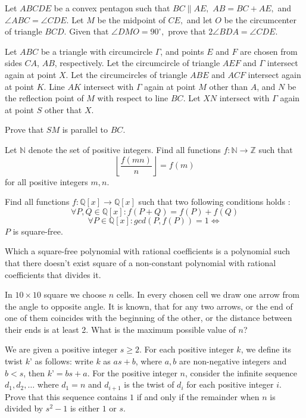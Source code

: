\documentclass[11pt]{scrartcl}
\begin{document}
\begin{problem}[5891289107244537458]
Let $ABCDE$ be a convex pentagon such that $BC \parallel AE,$ $AB = BC +  AE,$ and $\angle ABC = \angle CDE.$ Let $M$ be the midpoint of $CE,$ and let $O$ be the circumcenter of triangle $BCD.$ Given that $\angle DMO = 90^{\circ},$ prove that $2 \angle BDA = \angle CDE.$
\end{problem}
\begin{problem}[5897111412933990257]
Let $ABC$ be a triangle with circumcircle $\Gamma$, and points $E$ and $F$ are chosen from sides $CA$, $AB$, respectively. Let the circumcircle of triangle $AEF$ and $\Gamma$ intersect again at point $X$. Let the circumcircles of triangle $ABE$ and $ACF$ intersect again at point $K$. Line $AK$ intersect with $\Gamma$ again at point $M$ other than $A$, and $N$ be the reflection point of $M$ with respect to line $BC$. Let $XN$ intersect with $\Gamma$ again at point $S$ other that $X$.

Prove that $SM$ is parallel to $BC$.
\end{problem}
\begin{problem}[5901329049595563801]
Let $\mathbb{N}$ denote the set of positive integers. Find all functions $f \colon \mathbb{N} \to \mathbb{Z}$ such that\[\left\lfloor \frac{f(mn)}{n} \right\rfloor=f(m)\]for all positive integers $m,n$.
\end{problem}
\begin{problem}[5945620820312366964]
Find all functions $f : \mathbb{Q}[x] \to \mathbb{Q}[x]$ such that two following conditions holds :
$$\forall P , Q \in \mathbb{Q}[x] : f(P+Q)=f(P)+f(Q)$$$$\forall P \in \mathbb{Q}[x] : gcd(P , f(P))=1 \iff$$$P$ is square-free.


Which a square-free polynomial with rational coefficients is a polynomial such that there doesn't exist square of a non-constant polynomial with rational coefficients that divides it.
\end{problem}
\begin{problem}[5949258338135822858]
In $10\times 10$ square we choose $n$ cells. In every chosen cell we draw one arrow from the angle to opposite angle. It is known, that for any two arrows, or the end of one of them coincides with the beginning of the other, or
the distance between their ends is at least 2. What is the maximum possible value of $n$?
\end{problem}
\begin{problem}[5952830561616844902]
	We are given a positive integer $s \ge 2$. For each positive integer $k$, we define its twist $k’$ as follows: write $k$ as $as+b$, where $a, b$ are non-negative integers and $b < s$, then $k’ = bs+a$. For the positive integer $n$, consider the infinite sequence $d_1, d_2, \dots$ where $d_1=n$ and $d_{i+1}$ is the twist of $d_i$ for each positive integer $i$.
Prove that this sequence contains $1$ if and only if the remainder when $n$ is divided by $s^2-1$ is either $1$ or $s$.
\end{problem}
\end{document}
